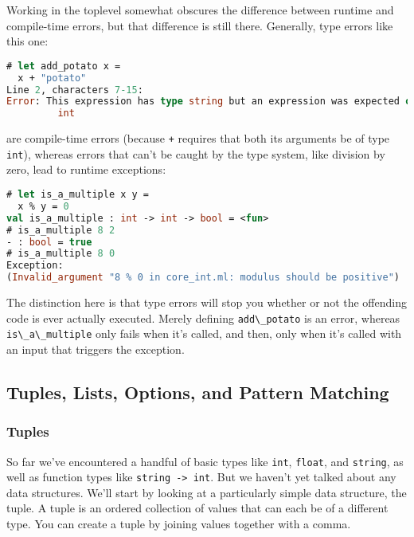 Working in the toplevel somewhat obscures the difference between runtime
and compile-time errors, but that difference is still there. Generally,
type errors like this one:

\begin{lstlisting}[language=Caml]
# let add_potato x =
  x + "potato"
Line 2, characters 7-15:
Error: This expression has type string but an expression was expected of type
         int
\end{lstlisting}

are compile-time errors (because \passthrough{\lstinline!+!} requires
that both its arguments be of type \passthrough{\lstinline!int!}),
whereas errors that can't be caught by the type system, like division by
zero, lead to runtime exceptions:

\begin{lstlisting}[language=Caml]
# let is_a_multiple x y =
  x % y = 0
val is_a_multiple : int -> int -> bool = <fun>
# is_a_multiple 8 2
- : bool = true
# is_a_multiple 8 0
Exception:
(Invalid_argument "8 % 0 in core_int.ml: modulus should be positive")
\end{lstlisting}

The distinction here is that type errors will stop you whether or not
the offending code is ever actually executed. Merely defining
\passthrough{\lstinline!add\_potato!} is an error, whereas
\passthrough{\lstinline!is\_a\_multiple!} only fails when it's called,
and then, only when it's called with an input that triggers the
exception.

\hypertarget{tuples-lists-options-and-pattern-matching}{%
\subsection{Tuples, Lists, Options, and Pattern
Matching}\label{tuples-lists-options-and-pattern-matching}}

\hypertarget{tuples}{%
\subsubsection{Tuples}\label{tuples}}

So far we've encountered a handful of basic types like
\passthrough{\lstinline!int!}, \passthrough{\lstinline!float!}, and
\passthrough{\lstinline!string!}, as well as function types like
\passthrough{\lstinline!string -> int!}. But we haven't yet talked about
any data structures. We'll start by looking at a particularly simple
data structure, the tuple. A tuple is an ordered collection of values
that can each be of a different type. You can create a tuple by joining
values together with a comma.

